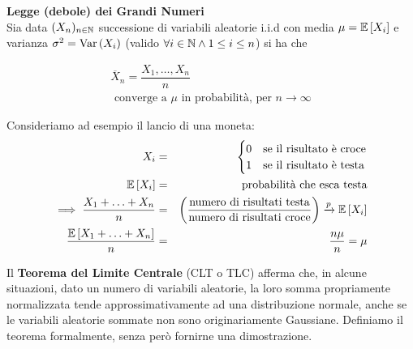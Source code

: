 \begin{defn}
    \textbf{Legge (debole) dei Grandi Numeri} \\
    Sia data $(X_n)_{n \in \mathbb{N}}$ successione di variabili aleatorie i.i.d con
    media $\mu = \mathbb{E}\left[X_i\right]$ e varianza $\sigma^2 = \text{Var}\left(X_i\right)$ (valido $\forall i \in \mathbb{N}
    \land 1 \leq i \leq n$) si ha che

    \begin{equation*}
        \begin{aligned}
            \overline{X}_n = \dfrac{X_1, \hdots, X_n}{n} \\
            \text{ converge a } \mu \text{ in probabilità, per } n \to \infty
        \end{aligned}
    \end{equation*}
\end{defn}

\begin{exmp}
    Consideriamo ad esempio il lancio di una moneta:
    \begin{eqnarray*}
            X_i &=& \begin{cases}
                0 & \text{se il risultato è croce} \\
                1 & \text{se il risultato è testa}
            \end{cases} \\
            \mathbb{E}\left[X_i\right] &=& \text{probabilità che esca testa} \\
            \implies \frac{X_1 + \hdots + X_n}{n} &=& \left(\frac{\text{numero di risultati testa}}{\text{numero di risultati croce}}\right)
            \xrightarrow{p} \mathbb{E}\left[X_i\right] \\
            \frac{\mathbb{E}\left[X_1 + \hdots + X_n\right]}{n} &=& \frac{n\mu}{n} = \mu
    \end{eqnarray*}
\end{exmp}


Il \textbf{Teorema del Limite Centrale} (CLT o TLC) afferma che, in alcune
situazioni, dato un numero di variabili aleatorie, la loro somma
propriamente normalizzata tende approssimativamente ad una distribuzione
normale, anche se le variabili aleatorie sommate non sono originariamente
Gaussiane. Definiamo il teorema formalmente, senza però fornirne una dimostrazione.


